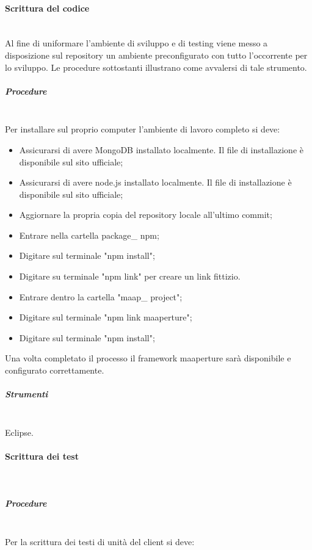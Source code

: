 \paragraph{Scrittura del codice} \hfill \\
Al fine di uniformare l'ambiente di sviluppo e di testing viene messo a disposizione sul repository un ambiente preconfigurato con tutto l'occorrente per lo sviluppo.
Le procedure sottostanti illustrano come avvalersi di tale strumento.

\subparagraph{Procedure} \hfill \\
Per installare sul proprio computer l'ambiente di lavoro completo si deve:

\begin{itemize}
\item Assicurarsi di avere MongoDB installato localmente. Il file di installazione è disponibile sul sito ufficiale;
\item Assicurarsi di avere node.js installato localmente.  Il file di installazione è disponibile sul sito ufficiale;
\item Aggiornare la propria copia del repository locale all'ultimo commit;
\item Entrare nella cartella package\_ npm;
\item Digitare sul terminale "npm install";
\item Digitare su terminale "npm link" per creare un link fittizio.
\item Entrare dentro la cartella "maap\_ project";
\item Digitare sul terminale "npm link maaperture";
\item Digitare sul terminale "npm install";

\end{itemize}

Una volta completato il processo il framework maaperture sarà disponibile e configurato correttamente.

\subparagraph{Strumenti} \hfill \\

Eclipse.

\paragraph{Scrittura dei test} \hfill \\

\subparagraph{Procedure} \hfill \\
Per la scrittura dei testi di unità del client si deve:

